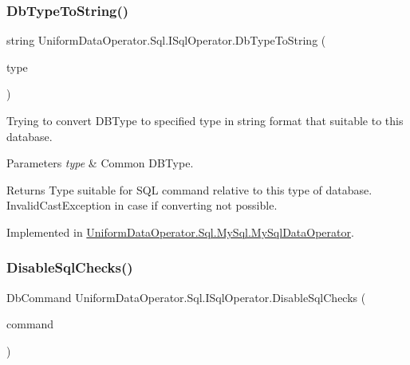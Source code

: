 \subsubsection{\texorpdfstring{Db\+Type\+To\+String()}{DbTypeToString()}}
{\footnotesize\ttfamily string Uniform\+Data\+Operator.\+Sql.\+I\+Sql\+Operator.\+Db\+Type\+To\+String (\begin{DoxyParamCaption}\item[{Db\+Type}]{type }\end{DoxyParamCaption})}



Trying to convert D\+B\+Type to specified type in string format that suitable to this database. 


\begin{DoxyParams}{Parameters}
{\em type} & Common D\+B\+Type.\\
\hline
\end{DoxyParams}
\begin{DoxyReturn}{Returns}
Type suitable for S\+QL command relative to this type of database. Invalid\+Cast\+Exception in case if converting not possible.
\end{DoxyReturn}


Implemented in \mbox{\hyperlink{class_uniform_data_operator_1_1_sql_1_1_my_sql_1_1_my_sql_data_operator_a7b854ebbcdf31c67716d8c365c321a31}{Uniform\+Data\+Operator.\+Sql.\+My\+Sql.\+My\+Sql\+Data\+Operator}}.

\mbox{\label{interface_uniform_data_operator_1_1_sql_1_1_i_sql_operator_a12d464e0532a3e194b1221eee0c32d34}} 
\subsubsection{\texorpdfstring{Disable\+Sql\+Checks()}{DisableSqlChecks()}\hspace{0.1cm}{\footnotesize\ttfamily [1/2]}}
{\footnotesize\ttfamily Db\+Command Uniform\+Data\+Operator.\+Sql.\+I\+Sql\+Operator.\+Disable\+Sql\+Checks (\begin{DoxyParamCaption}\item[{Db\+Command}]{command }\end{DoxyParamCaption})}



